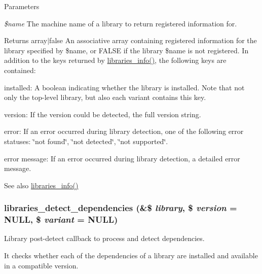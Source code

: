 \begin{DoxyParams}{Parameters}
\item[{\em \$name}]The machine name of a library to return registered information for.\end{DoxyParams}
\begin{DoxyReturn}{Returns}
array$|$false An associative array containing registered information for the library specified by \$name, or FALSE if the library \$name is not registered. In addition to the keys returned by \hyperlink{libraries_8module_ae592b03bbea251cc7c008cd5ed10c861}{libraries\_\-info()}, the following keys are contained:
\begin{DoxyItemize}
\item installed: A boolean indicating whether the library is installed. Note that not only the top-\/level library, but also each variant contains this key.
\item version: If the version could be detected, the full version string.
\item error: If an error occurred during library detection, one of the following error statuses: \char`\"{}not found\char`\"{}, \char`\"{}not detected\char`\"{}, \char`\"{}not supported\char`\"{}.
\item error message: If an error occurred during library detection, a detailed error message.
\end{DoxyItemize}
\end{DoxyReturn}
\begin{DoxySeeAlso}{See also}
\hyperlink{libraries_8module_ae592b03bbea251cc7c008cd5ed10c861}{libraries\_\-info()} 
\end{DoxySeeAlso}
\hypertarget{libraries_8module_af3d912272d3f4267e03767202fe0f4e7}{
\subsubsection[{libraries\_\-detect\_\-dependencies}]{\setlength{\rightskip}{0pt plus 5cm}libraries\_\-detect\_\-dependencies (\&\$ {\em library}, \/  \$ {\em version} = {\ttfamily NULL}, \/  \$ {\em variant} = {\ttfamily NULL})}}
\label{libraries_8module_af3d912272d3f4267e03767202fe0f4e7}
Library post-\/detect callback to process and detect dependencies.

It checks whether each of the dependencies of a library are installed and available in a compatible version.


